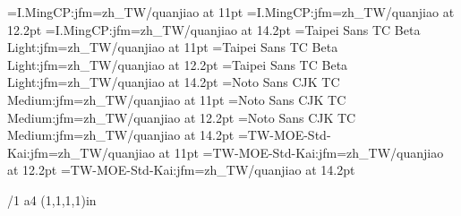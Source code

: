 
\jfont\ming={I.MingCP:jfm=zh_TW/quanjiao} at 11pt
\jfont\mingl={I.MingCP:jfm=zh_TW/quanjiao} at 12.2pt
\jfont\mingL={I.MingCP:jfm=zh_TW/quanjiao} at 14.2pt
\jfont\hei={Taipei Sans TC Beta Light:jfm=zh_TW/quanjiao} at 11pt
\jfont\heil={Taipei Sans TC Beta Light:jfm=zh_TW/quanjiao} at 12.2pt
\jfont\heiL={Taipei Sans TC Beta Light:jfm=zh_TW/quanjiao} at 14.2pt
\jfont\heib={Noto Sans CJK TC Medium:jfm=zh_TW/quanjiao} at 11pt
\jfont\heibl={Noto Sans CJK TC Medium:jfm=zh_TW/quanjiao} at 12.2pt
\jfont\heibL={Noto Sans CJK TC Medium:jfm=zh_TW/quanjiao} at 14.2pt
\jfont\kai={TW-MOE-Std-Kai:jfm=zh_TW/quanjiao} at 11pt
\jfont\kail={TW-MOE-Std-Kai:jfm=zh_TW/quanjiao} at 12.2pt
\jfont\kaiL={TW-MOE-Std-Kai:jfm=zh_TW/quanjiao} at 14.2pt


\margins/1 a4 (1,1,1,1)in  %
\typosize[11/18.4]

